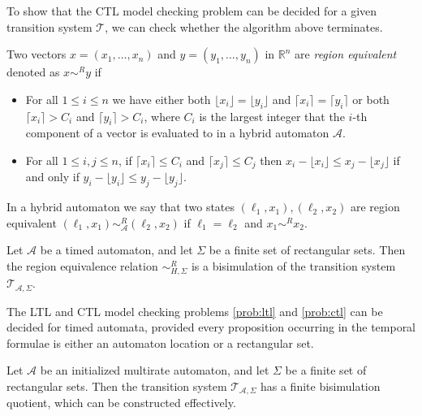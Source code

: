 To show that the CTL model checking problem can be decided for a given transition system $\mathcal{T}$, we can check whether the algorithm above terminates.

\begin{defi}
Two vectors $x=(x_{1},\ldots,x_{n})$ and $y=(y_{1},\ldots,y_{n})$ in $\mathbb{R}^{n}$ are \emph{region equivalent} denoted as $x\sim^{R}y$ if
\begin{itemize}
    \item{For all $1\leq i \leq n$ we have either both $\lfloor x_{i}\rfloor = \lfloor y_{i}\rfloor$ and $\lceil x_{i}\rceil = \lceil y_{i}\rceil$ or both $\lceil x_{i}\rceil > C_{i}$ and $\lceil y_{i}\rceil>C_{i}$, where $C_{i}$ is the largest integer that the $i$-th component of a vector is evaluated to in a hybrid automaton $\mathcal{A}$.}
    \item{For all $1\leq i,j \leq n$, if $\lceil x_{i}\rceil \leq C_{i}$ and $\lceil x_{j}\rceil \leq C_{j}$ then $x_{i}-\lfloor x_{i}\rfloor \leq x_{j}-\lfloor x_{j}\rfloor$ if and only if $y_{i}-\lfloor y_{i}\rfloor \leq y_{j}-\lfloor y_{j}\rfloor$.}
\end{itemize}
\end{defi}

In a hybrid automaton we say that two states $(\ell_{1},x_{1}), (\ell_{2},x_{2})$ are region equivalent $(\ell_{1},x_{1})\sim^{R}_{\mathcal{A}}(\ell_{2},x_{2})$ if $\ell_{1}=\ell_2$ and $x_{1}\sim^{R}x_{2}$.

\begin{thm}
Let $\mathcal{A}$ be a timed automaton, and let $\Sigma$ be a finite set of rectangular sets. Then the region equivalence relation $\sim_{H,\Sigma}^{R}$ is a bisimulation of the transition system $\mathcal{T}_{\mathcal{A},\Sigma}$.
\end{thm}

\begin{cor}
The LTL and CTL model checking problems \ref{prob:ltl} and \ref{prob:ctl} can be decided for timed automata, provided every proposition occurring in the temporal formulae is either an automaton location or a rectangular set.
\end{cor}

\begin{thm}
Let $\mathcal{A}$ be an initialized multirate automaton, and let $\Sigma$ be a finite set of rectangular sets. Then the transition system $\mathcal{T}_{\mathcal{A},\Sigma}$ has a finite bisimulation quotient, which can be constructed effectively.
\end{thm}

